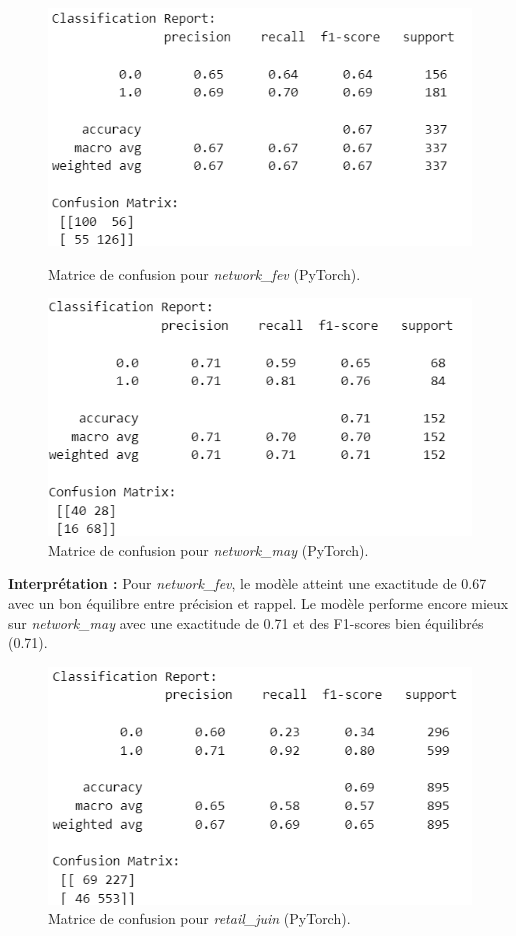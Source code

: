 \begin{figure}[H]
    \centering
    \begin{minipage}{0.45\linewidth}
        \centering
        \includegraphics[width=1\linewidth]{capture_modele_25.png}
        \caption{Matrice de confusion pour \textit{network\_fev} (PyTorch).}
    \end{minipage}\hfill
    \begin{minipage}{0.45\linewidth}
        \centering
        \includegraphics[width=1\linewidth]{capture_modele_26.png}
        \caption{Matrice de confusion pour \textit{network\_may} (PyTorch).}
    \end{minipage}
\end{figure}

\textbf{Interprétation :} Pour \textit{network\_fev}, le modèle atteint une exactitude de 0.67 avec un bon équilibre entre précision et rappel. Le modèle performe encore mieux sur \textit{network\_may} avec une exactitude de 0.71 et des F1-scores bien équilibrés (0.71).

\begin{figure}[H]
    \centering
    \includegraphics[width=0.6\linewidth]{capture_modele_27.png}
    \caption{Matrice de confusion pour \textit{retail\_juin} (PyTorch).}
\end{figure}

